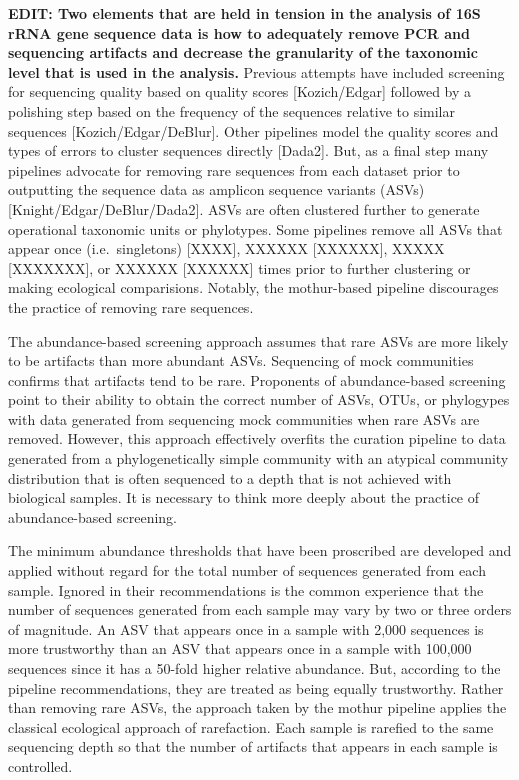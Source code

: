 \documentclass[]{article}
\begin{document}
\textbf{EDIT: Two elements that are held in tension in the analysis of
16S rRNA gene sequence data is how to adequately remove PCR and
sequencing artifacts and decrease the granularity of the taxonomic level
that is used in the analysis.} Previous attempts have included screening
for sequencing quality based on quality scores {[}Kozich/Edgar{]}
followed by a polishing step based on the frequency of the sequences
relative to similar sequences {[}Kozich/Edgar/DeBlur{]}. Other pipelines
model the quality scores and types of errors to cluster sequences
directly {[}Dada2{]}. But, as a final step many pipelines advocate for
removing rare sequences from each dataset prior to outputting the
sequence data as amplicon sequence variants (ASVs)
{[}Knight/Edgar/DeBlur/Dada2{]}. ASVs are often clustered further to
generate operational taxonomic units or phylotypes. Some pipelines
remove all ASVs that appear once (i.e.~singletons) {[}XXXX{]}, XXXXXX
{[}XXXXXX{]}, XXXXX {[}XXXXXXX{]}, or XXXXXX {[}XXXXXX{]} times prior to
further clustering or making ecological comparisions. Notably, the
mothur-based pipeline discourages the practice of removing rare
sequences.

The abundance-based screening approach assumes that rare ASVs are more
likely to be artifacts than more abundant ASVs. Sequencing of mock
communities confirms that artifacts tend to be rare. Proponents of
abundance-based screening point to their ability to obtain the correct
number of ASVs, OTUs, or phylogypes with data generated from sequencing
mock communities when rare ASVs are removed. However, this approach
effectively overfits the curation pipeline to data generated from a
phylogenetically simple community with an atypical community
distribution that is often sequenced to a depth that is not achieved
with biological samples. It is necessary to think more deeply about the
practice of abundance-based screening.

The minimum abundance thresholds that have been proscribed are developed
and applied without regard for the total number of sequences generated
from each sample. Ignored in their recommendations is the common
experience that the number of sequences generated from each sample may
vary by two or three orders of magnitude. An ASV that appears once in a
sample with 2,000 sequences is more trustworthy than an ASV that appears
once in a sample with 100,000 sequences since it has a 50-fold higher
relative abundance. But, according to the pipeline recommendations, they
are treated as being equally trustworthy. Rather than removing rare
ASVs, the approach taken by the mothur pipeline applies the classical
ecological approach of rarefaction. Each sample is rarefied to the same
sequencing depth so that the number of artifacts that appears in each
sample is controlled.
\end{document}
